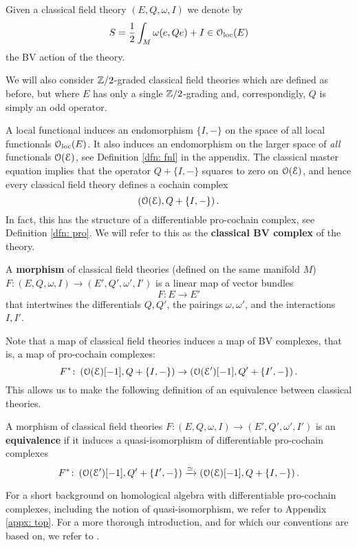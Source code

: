 \documentclass[10pt, oneside]{article}
\begin{document}
Given a classical field theory $(E, Q, \omega, I)$ we denote by
\[S = \frac{1}{2} \int_M \omega(e, Q e) + I\in \mathcal{O}_{\rm loc}(E)\]
the BV action of the theory.

\begin{remark}
We will also consider $\mathbb Z/2$-graded classical field theories which are defined as before, but where $E$ has only a single $\mathbb Z/2$-grading and, correspondigly, $Q$ is simply an odd operator.
\end{remark}

A local functional induces an endomorphism $\{I,-\}$ on the space of all local functionals $\mathcal{O}_{\rm loc}(E)$. 
It also induces an endomorphism on the larger space of {\em all} functionals $\mathcal O(\mathcal E)$, see Definition \ref{dfn: fnl} in the appendix. 
The classical master equation implies that the operator $Q + \{I,-\}$ squares to zero on $\mathcal O(\mathcal E)$, and hence every classical field theory defines a cochain complex
\begin{equation}\label{bvcplx}
\left(\mathcal O(\mathcal E), Q + \{I,-\}\right) .
\end{equation}
In fact, this has the structure of a differentiable pro-cochain complex, see Definition \ref{dfn: pro}. 
We will refer to this as the {\bf classical BV complex} of the theory. 

\begin{dfn}
A {\bf morphism} of classical field theories (defined on the same manifold $M$) $F\colon (E, Q, \omega, I) \to (E', Q', \omega', I')$ is a linear map of vector bundles
\[
F\colon E \to E'
\]
that intertwines the differentials $Q, Q'$, the pairings $\omega, \omega'$, and the interactions $I,I'$. 
\end{dfn}

Note that a map of classical field theories induces a map of BV complexes, that is, a map of pro-cochain complexes:
\[
F^*\colon \left(\mathcal O (\mathcal E)[-1], Q + \{I,-\} \right) \to \left(\mathcal O (\mathcal E')[-1], Q' + \{I',-\} \right) .
\]
This allows us to make the following definition of an equivalence between classical theories. 

\begin{dfn} \label{equivalence_def}
A morphism of classical field theories $F\colon (E, Q, \omega, I) \to (E', Q', \omega', I')$ is an {\bf equivalence} if it induces a quasi-isomorphism of differentiable pro-cochain complexes
\[
F^* \colon  \left(\mathcal O(\mathcal E')[-1], Q' + \{I',-\} \right) \xrightarrow{\simeq} \left(\mathcal O(\mathcal E)[-1], Q + \{I,-\} \right) .
\]
\end{dfn}

For a short background on homological algebra with differentiable pro-cochain complexes, including the notion of quasi-isomorphism, we refer to Appendix \ref{appx: top}.
For a more thorough introduction, and for which our conventions are based on, we refer to \cite{CG1}. 
\end{document}
